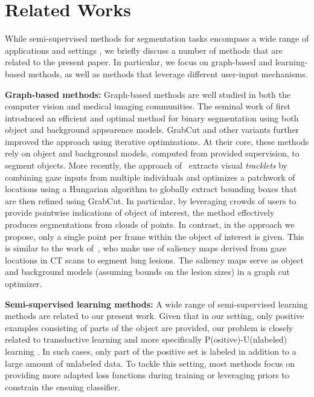 \section{Related Works}
\label{sec:related_works}
While semi-supervised methods for segmentation tasks encompass a wide range of applications and settings \cite{Chapelle2006}, we briefly discuss a number of methods that are related to the present paper. In particular, we focus on graph-based and learning-based methods, as well as methods that leverage different user-input mechanisms.

\noindent
{\bf Graph-based methods:} 
Graph-based methods are well studied in both the computer vision and medical imaging communities. The seminal work of \cite{Boykov2006} first introduced an efficient and optimal method for binary segmentation using both object and background appearence models. GrabCut and other variants \cite{rother04,yu2014} further improved the approach using iterative optimizations. At their core, these methods rely on object and background models, computed from provided supervision, to segment objects. More recently, the approach of~\cite{karthikeyan13} extracts visual {\it tracklets} by combining gaze inputs from multiple individuals and optimizes a patchwork of locations using a Hungarian algorithm to globally extract bounding boxes that are then refined using GrabCut. In particular, by leveraging crowds of users to provide pointwise indications of object of interest, the method effectively produces segmentations from clouds of points. In contrast, in the approach we propose, only a single point per frame within the object of interest is given. This is similar to the work of~\cite{khosravan16}, who make use of saliency maps \cite{koch98} derived from gaze locations in CT scans to segment lung lesions. The saliency maps serve as object and background models (assuming bounds on the lesion sizes) in a graph cut optimizer.

\noindent
{\bf Semi-supervised learning methods:} A wide range of semi-supervised learning methods are related to our present work. Given that in our setting, only positive examples consisting of parts of the object are provided, our problem is closely related to transductive learning \cite{Burges13,Guyon17} and more specifically P(ositive)-U(nlabeled) learning \cite{Li2005,Kiryo2017}. In such cases,  only part of the positive set is labeled in addition to a large amount of unlabeled data. To tackle this setting, most methods focus on providing more adapted loss functions during training or leveraging priors to constrain the ensuing classifier.

